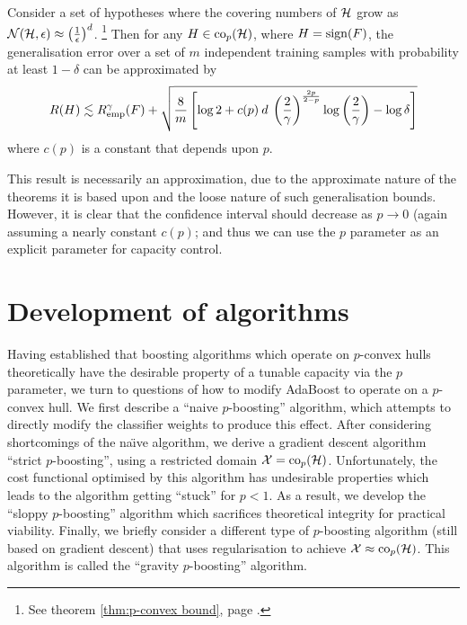 \begin{theorem}
\label{thm:p convex generalisation}
Consider a set of hypotheses where the covering numbers of $\mathcal{H}$
grow as $\mathcal{N}({\mathcal{H}}, {\epsilon}) \approx \left ( \frac{1}{\epsilon}
\right) ^d$.%
\footnote{See theorem \ref{thm:p-convex bound}, page
\pageref{thm:p-convex bound}.}
Then for any $H \in \mathrm{co}_p(\mathcal{H})$, where $H = \mathrm{sign}(F)$, the
generalisation error over a set of $m$ independent training samples
with probability at least $1 - \delta$ can be approximated by 
%
\begin{equation}
R(H) \lesssim R_{\mathrm{emp}}^{\gamma}(F) + \sqrt{ \frac{8}{m} \left[ \log 2
+ c(p) \: d \: \left( \frac{2}{\gamma} \right)^{\frac{2p}{2-p}} \log
\left( \frac{2}{\gamma} \right) - \log \delta \right]}
\end{equation}
where $c(p)$ is a constant that depends upon $p$. 
%
\end{theorem}

This result is necessarily an approximation, due to the approximate
nature of the theorems it is based upon and the loose nature of such
generalisation bounds.  However, it is clear that the confidence
interval should decrease as $p \rightarrow 0$ (again assuming a nearly
constant $c(p)$; and thus we can use the $p$ parameter as an explicit
parameter for capacity control.


\section{Development of algorithms}

Having established that boosting algorithms which operate on
$p$-convex hulls theoretically have the desirable property of a
tunable capacity via the $p$ parameter, we turn to questions of how to
modify AdaBoost to operate on a $p$-convex hull.  We first describe a
``naive $p$-boosting'' algorithm, which attempts to directly modify
the classifier weights to produce this effect.  After considering
shortcomings of the na\"{\i}ve algorithm, we derive a gradient descent
algorithm ``strict $p$-boosting'', using a restricted domain $\mathcal{X} =
\mathrm{co}_p (\mathcal{H})$.  Unfortunately, the cost functional optimised by this
algorithm has undesirable properties which leads to the algorithm
getting ``stuck'' for $p < 1$.  As a result, we develop the ``sloppy
$p$-boosting'' algorithm which sacrifices theoretical integrity for
practical viability.  Finally, we briefly consider a different type of
$p$-boosting algorithm (still based on gradient descent) that uses
regularisation to achieve $\mathcal{X} \approx \mathrm{co}_p(\mathcal{H})$.  This
algorithm is called the ``gravity $p$-boosting'' algorithm.


